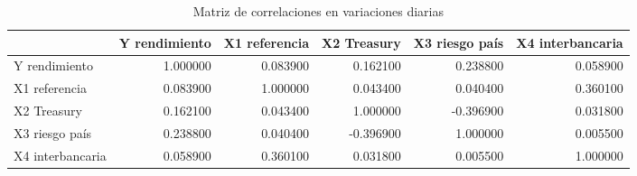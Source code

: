 \begin{table}
\caption{Matriz de correlaciones en variaciones diarias}
\label{tab:correlaciones}
\begin{tabular}{lrrrrr}
\toprule
 & Y rendimiento & X1 referencia & X2 Treasury & X3 riesgo país & X4 interbancaria \\
\midrule
Y rendimiento & 1.000000 & 0.083900 & 0.162100 & 0.238800 & 0.058900 \\
X1 referencia & 0.083900 & 1.000000 & 0.043400 & 0.040400 & 0.360100 \\
X2 Treasury & 0.162100 & 0.043400 & 1.000000 & -0.396900 & 0.031800 \\
X3 riesgo país & 0.238800 & 0.040400 & -0.396900 & 1.000000 & 0.005500 \\
X4 interbancaria & 0.058900 & 0.360100 & 0.031800 & 0.005500 & 1.000000 \\
\bottomrule
\end{tabular}
\end{table}
